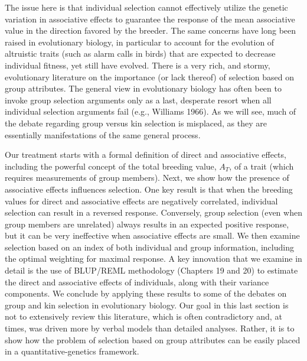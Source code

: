 \documentclass{article}
\begin{document}
The issue here is that individual selection cannot effectively utilize the genetic variation in associative effects to guarantee the response of the mean associative value in the direction favored by the breeder. The same concerns have long been raised in evolutionary biology, in particular to account for the evolution of altruistic traits (such as alarm calls in birds) that are expected to decrease individual fitness, yet still have evolved. There is a very rich, and stormy, evolutionary literature on the importance (or lack thereof) of selection based on group attributes. The general view in evolutionary biology has often been to invoke group selection arguments only as a last, desperate resort when all individual selection arguments fail (e.g., Williams 1966). As we will see, much of the debate regarding group versus kin selection is misplaced, as they are essentially manifestations of the same general process.

Our treatment starts with a formal definition of direct and associative effects, including the powerful concept of the total breeding value,  $ A_{T} $, of a trait (which requires measurements of group members). Next, we show how the presence of associative effects influences selection. One key result is that when the breeding values for direct and associative effects are negatively correlated, individual selection can result in a reversed response. Conversely, group selection (even when group members are unrelated) always results in an expected positive response, but it can be very ineffective when associative effects are small. We then examine selection based on an index of both individual and group information, including the optimal weighting for maximal response. A key innovation that we examine in detail is the use of BLUP/REML methodology (Chapters 19 and 20) to estimate the direct and associative effects of individuals, along with their variance components. We conclude by applying these results to some of the debates on group and kin selection in evolutionary biology. Our goal in this last section is not to extensively review this literature, which is often contradictory and, at times, was driven more by verbal models than detailed analyses. Rather, it is to show how the problem of selection based on group attributes can be easily placed in a quantitative-genetics framework.
\end{document}
